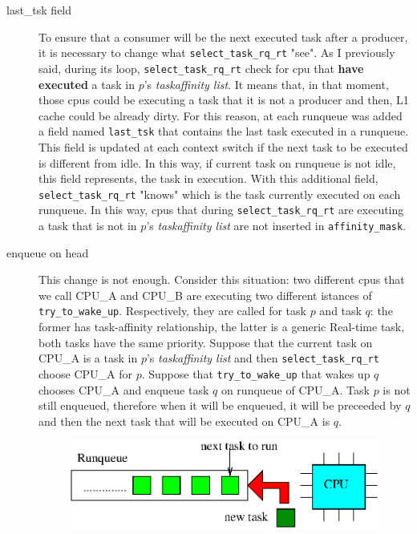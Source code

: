 \begin{description}

\item[last\_tsk field] To ensure that a consumer will be the next executed task after a producer, it is necessary to change what 
\texttt{select\_task\_rq\_rt} "see". As I previously said, during its loop, \texttt{select\_task\_rq\_rt} check for cpu that \textbf{have executed} a 
task in $p$'s \textit{taskaffinity list}. It means that, in that moment, those cpus could be executing a task that it is not a producer and then, L1 cache 
could be already dirty. For this reason, at each runqueue was added a field named \texttt{last\_tsk} that contains the last task executed in a runqueue. 
This field is updated at each context switch if the next task to be executed is different from idle. In this way, if current task on runqueue is not idle, 
this field represents, the task in execution. With this additional field, \texttt{select\_task\_rq\_rt} "knows" which is the task currently executed on 
each runqueue. In this way, cpus that during \texttt{select\_task\_rq\_rt} are executing a task that is not in $p$'s \textit{taskaffinity list} are not 
inserted in \texttt{affinity\_mask}.

\item[enqueue on head] This change is not enough. Consider this situation: two different cpus that we call CPU\_A and CPU\_B are executing two different 
istances of \texttt{try\_to\_wake\_up}. Respectively, they are called for task $p$ and task $q$: the former has task-affinity relationship, the latter is 
a generic Real-time task, both tasks have the same priority. Suppose that the current task on CPU\_A is a task in $p$'s \textit{taskaffinity list} and then 
\texttt{select\_task\_rq\_rt} choose CPU\_A for $p$. Suppose that \texttt{try\_to\_wake\_up} that wakes up $q$ chooses CPU\_A and enqueue task $q$ on 
runqueue of CPU\_A. Task $p$ is not still enqueued, therefore when it will be enqueued, it will be preceeded by $q$ and then the next task that will
be executed on CPU\_A is $q$.

\begin{figure}[htbp]
\centering
\includegraphics[width=\widefigure]{images/enq_head.eps}
\caption{}
\label{fig:enq_head}
\end{figure}


\end{description}

